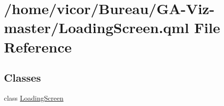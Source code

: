 \hypertarget{_loading_screen_8qml}{}\section{/home/vicor/\+Bureau/\+G\+A-\/\+Viz-\/master/\+Loading\+Screen.qml File Reference}
\label{_loading_screen_8qml}
\subsection*{Classes}
\begin{DoxyCompactItemize}
\item 
class \hyperlink{class_loading_screen}{Loading\+Screen}
\end{DoxyCompactItemize}
